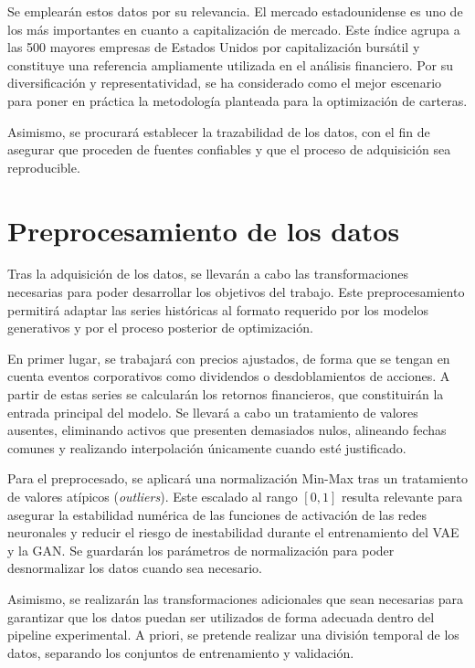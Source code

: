 Se emplearán estos datos por su relevancia. El mercado estadounidense es uno de los más importantes en cuanto a capitalización de mercado. Este índice agrupa a las 500 mayores empresas de Estados Unidos por capitalización bursátil y constituye una referencia ampliamente utilizada en el análisis financiero. Por su diversificación y representatividad, se ha considerado como el mejor escenario para poner en práctica la metodología planteada para la optimización de carteras.

Asimismo, se procurará establecer la trazabilidad de los datos, con el fin de asegurar que proceden de fuentes confiables y que el proceso de adquisición sea reproducible.

\section{Preprocesamiento de los datos}

Tras la adquisición de los datos, se llevarán a cabo las transformaciones necesarias para poder desarrollar los objetivos del trabajo. Este preprocesamiento permitirá adaptar las series históricas al formato requerido por los modelos generativos y por el proceso posterior de optimización.

En primer lugar, se trabajará con precios ajustados, de forma que se tengan en cuenta eventos corporativos como dividendos o desdoblamientos de acciones. A partir de estas series se calcularán los retornos financieros, que constituirán la entrada principal del modelo. Se llevará a cabo un tratamiento de valores ausentes, eliminando activos que presenten demasiados nulos, alineando fechas comunes y realizando interpolación únicamente cuando esté justificado.

Para el preprocesado, se aplicará una normalización Min-Max tras un tratamiento de valores atípicos (\textit{outliers}). Este escalado al rango $[0,1]$ resulta relevante para asegurar la estabilidad numérica de las funciones de activación de las redes neuronales y reducir el riesgo de inestabilidad durante el entrenamiento del VAE y la GAN. Se guardarán los parámetros de normalización para poder desnormalizar los datos cuando sea necesario.

Asimismo, se realizarán las transformaciones adicionales que sean necesarias para garantizar que los datos puedan ser utilizados de forma adecuada dentro del pipeline experimental. A priori, se pretende realizar una división temporal de los datos, separando los conjuntos de entrenamiento y validación.

